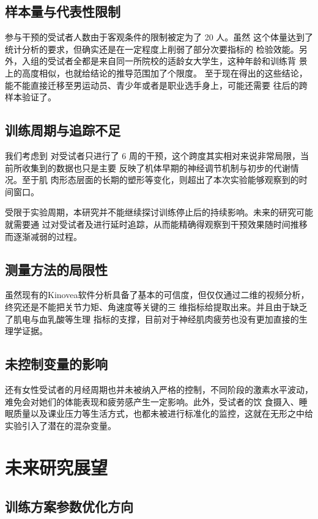 \documentclass[a4paper,12pt]{article}
\begin{document}
\subsection{样本量与代表性限制}

参与干预的受试者人数由于客观条件的限制被定为了 20 人。虽然
这个体量达到了统计分析的要求，但确实还是在一定程度上削弱了部分次要指标的
检验效能。另外，入组的受试者全都是来自同一所院校的适龄女大学生，这种年龄和训练背
景上的高度相似，也就给结论的推导范围加了个限度。
至于现在得出的这些结论，能不能直接迁移至男运动员、青少年或者是职业选手身上，可能还需要
往后的跨样本验证了。

\subsection{训练周期与追踪不足}

我们考虑到 对受试者只进行了 6 周的干预，这个跨度其实相对来说非常局限，当前所收集到的数据也只是主要
反映了机体早期的神经调节机制与初步的代谢情况。至于肌
肉形态层面的长期的塑形等变化，则超出了本次实验能够观察到的时间窗口。

受限于实验周期，本研究并不能继续探讨训练停止后的持续影响。未来的研究可能就需要通
过对受试者及进行延时追踪，从而能精确得观察到干预效果随时间推移而逐渐减弱的过程。
\subsection{测量方法的局限性}


虽然现有的Kinovea软件分析具备了基本的可信度，但仅仅通过二维的视频分析，终究还是不能把关节力矩、角速度等关键的三
维指标给提取出来。并且由于缺乏了肌电与血乳酸等生理
指标的支撑，目前对于神经肌肉疲劳也没有更加直接的生理学证据。

\subsection{未控制变量的影响}

还有女性受试者的月经周期也并未被纳入严格的控制，不同阶段的激素水平波动，难免会对她们的体能表现和疲劳感产生一定影响。此外，受试者的饮
食摄入、睡眠质量以及课业压力等生活方式，也都未被进行标准化的监控，这就在无形之中给实验引入了潜在的混杂变量。

\section{未来研究展望}

\subsection{训练方案参数优化方向}
\end{document}
